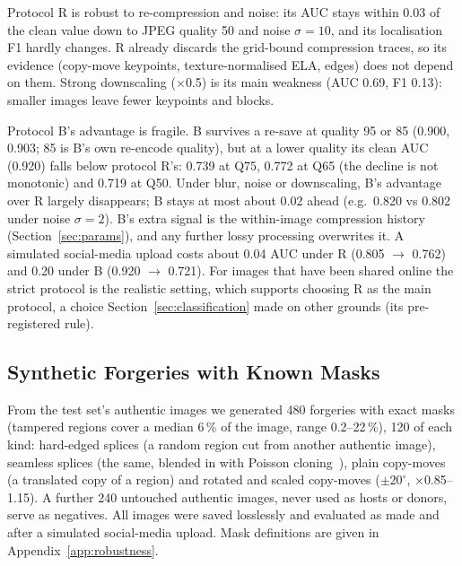 Protocol R is robust to re-compression and noise: its AUC stays within 0.03 of the clean value down to JPEG
quality 50 and noise $\sigma=10$, and its localisation F1 hardly changes. R already discards the grid-bound
compression traces, so its evidence (copy-move keypoints, texture-normalised ELA, edges) does not depend on them.
Strong downscaling ($\times$0.5) is its main weakness (AUC 0.69, F1 0.13): smaller images leave fewer keypoints
and blocks.

Protocol B's advantage is fragile. B survives a re-save at quality 95 or 85 (0.900, 0.903; 85 is B's own
re-encode quality), but at a lower quality its clean AUC (0.920) falls below protocol R's: 0.739 at Q75, 0.772 at
Q65 (the decline is not monotonic) and 0.719 at Q50. Under blur, noise or downscaling, B's advantage over R largely
disappears; B stays at most about 0.02 ahead (e.g.\ 0.820 vs 0.802 under noise $\sigma=2$). B's extra signal is
the within-image compression history (Section~\ref{sec:params}), and any further lossy processing overwrites it.
A simulated social-media upload costs about 0.04 AUC under R (0.805 $\to$ 0.762) and 0.20 under B
(0.920 $\to$ 0.721). For images that have been shared online the strict protocol is the realistic setting, which
supports choosing R as the main protocol, a choice Section~\ref{sec:classification} made on other grounds (its
pre-registered rule).

\subsection{Synthetic Forgeries with Known Masks}\label{sec:rob-synthetic}
From the test set's authentic images we generated 480 forgeries with exact masks (tampered regions cover a median
6\,\% of the image, range 0.2--22\,\%), 120 of each kind: hard-edged splices (a random region cut from another
authentic image), seamless splices (the same, blended in with Poisson cloning~\cite{perez2003poisson}), plain
copy-moves (a translated copy of a region) and rotated and scaled copy-moves ($\pm20^\circ$, $\times$0.85--1.15).
A further 240 untouched authentic images, never used as hosts or donors, serve as negatives. All images were
saved losslessly and evaluated as made and after a simulated social-media upload. Mask definitions are given in
Appendix~\ref{app:robustness}.

